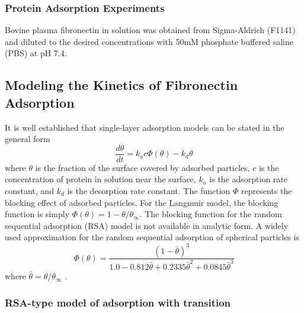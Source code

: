 \subsubsection{Protein Adsorption Experiments}

Bovine plasma fibronectin in solution was obtained from Sigma-Aldrich
(F1141) and diluted to the desired concentrations with 50mM phosphate
buffered saline (PBS) at pH 7.4.


\subsection{Modeling the Kinetics of Fibronectin Adsorption}

It is well established that single-layer adsorption models can be
stated in the general form\begin{equation}
\frac{d\theta}{dt}=k_{a}c\Phi\left(\theta\right)-k_{d}\theta\label{eq:Single Layer Kinetics}\end{equation}
where $\theta$ is the fraction of the surface covered by adsorbed
particles, $c$ is the concentration of protein in solution near the
surface, $k_{a}$ is the adsorption rate constant, and $k_{d}$ is
the desorption rate constant. The function $\Phi$ represents the
blocking effect of adsorbed particles. For the Langmuir model, the
blocking function is simply $\Phi\left(\theta\right)=1-\theta/\theta_{\infty}$.
The blocking function for the random sequential adsorption (RSA) model
is not available in analytic form. A widely used approximation for
the random sequential adsorption of spherical particles is\begin{equation}
\Phi\left(\theta\right)=\frac{\left(1-\bar{\theta}\right)^{3}}{1.0-0.812\bar{\theta}+0.2335\bar{\theta}^{2}+0.0845\bar{\theta}^{3}}\label{eq:RSA Blocking Function}\end{equation}
where $\bar{\theta}=\theta/\theta_{\infty}$ \cite{Schaaf1989}.


\subsubsection{RSA-type model of adsorption with transition}

